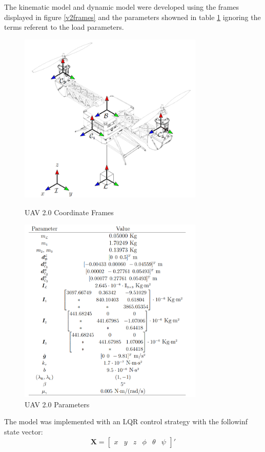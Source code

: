 The kinematic model and dynamic model were developed using the frames displayed in figure \ref{v2frames} and the parameters showned in table \ref{v2_tab} ignoring the terms referent to the load parameters.

\begin{figure} [!ht]
	\centering
	\begin{minipage}{.5\textwidth}
		\centering
		\includegraphics[width=250pt]{figuras/v2loadframes}
		\caption{UAV 2.0  Coordinate Frames}
		\label{v2frames}
	\end{minipage}%
	\begin{minipage}{.5\textwidth}
		\centering
		\includegraphics[width=250pt]{figuras/v2loadtab}
		\caption{UAV 2.0 Parameters}
		\label{v2_tab}
	\end{minipage}
\end{figure}

The model was implemented with an LQR control strategy with the followinf state vector:
\begin{equation*}
\bm{X} = \begin{bmatrix}
x & y & z & \phi & \theta & \psi
\end{bmatrix}'
\end{equation*} 


